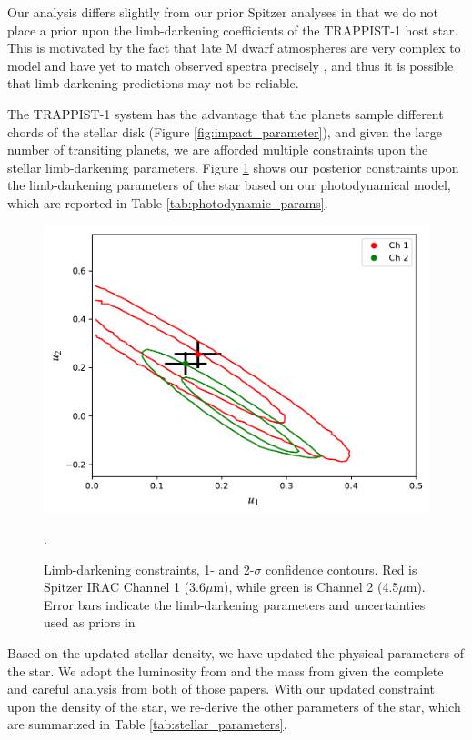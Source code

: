 \documentclass[fleqn,usenatbib]{mnras} %
\begin{document}
Our analysis differs slightly from our prior Spitzer analyses \citep{Delrez2018a,Ducrot2020} in that we do not place a prior upon the limb-darkening coefficients of the TRAPPIST-1 host star.  This is motivated by the fact that late M dwarf atmospheres are very complex to model and have yet to match observed spectra precisely \citep{Allard2011,Allard2012,Juncher2017}, and thus it is possible that limb-darkening predictions may not be reliable.

The TRAPPIST-1 system has the advantage that the planets sample different chords of the stellar disk (Figure \ref{fig:impact_parameter}), and given the large number of transiting planets, we are afforded multiple constraints upon the stellar limb-darkening parameters.  Figure \ref{fig:limb_darkening} shows our posterior constraints upon the limb-darkening parameters of the star based on our photodynamical model, which are reported in Table \ref{tab:photodynamic_params}.

\begin{figure}
    \centering
    \includegraphics[width=\hsize]{figures/limb_darkening_nouprior.pdf}
    \caption{Limb-darkening constraints, 1- and 2-$\sigma$ confidence contours.  Red is Spitzer IRAC Channel 1 (3.6$\mu$m), while green is Channel 2 (4.5$\mu$m).  Error bars indicate the limb-darkening parameters and uncertainties used as priors in \citet{Ducrot2020}}.
    \label{fig:limb_darkening}
\end{figure}

Based on the updated stellar density, we have updated the physical
parameters of the star.  We adopt the luminosity from \citet{Ducrot2020}
and the mass from \citet{Mann2019} given the complete and careful analysis
from both of those papers.  With our updated constraint upon the density
of the star, we re-derive the other parameters of the star, which are summarized in Table \ref{tab:stellar_parameters}.
\end{document}
